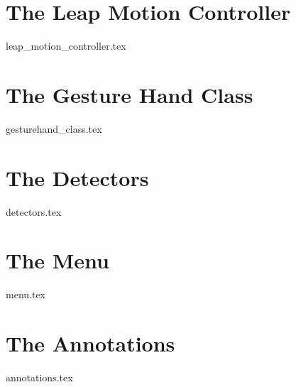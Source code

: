 \section{The Leap Motion Controller}
\label{sec:leap_motion_controller}
{leap_motion_controller.tex}


\section{The Gesture Hand Class}
\label{sec:gesturehand_class}
{gesturehand_class.tex}
 

\section{The Detectors}
\label{sec:detectors}
{detectors.tex}


\section{The Menu}
\label{sec:menu}
{menu.tex}


\section{The Annotations}
\label{sec:annotations}
{annotations.tex}


